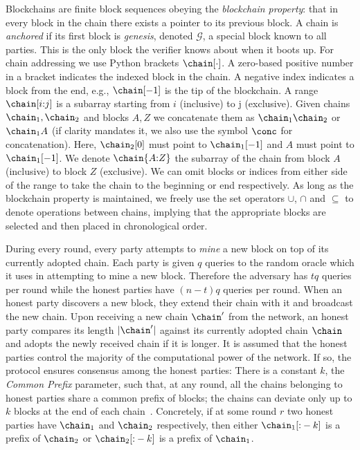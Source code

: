 Blockchains are finite block sequences obeying the \emph{blockchain property}:
that in every block in the chain there exists a pointer to its previous block. A
chain is \emph{anchored} if its first block is \emph{genesis}, denoted $\mathcal{G}$,
a special block known to all parties. This is the only block the verifier knows about
when it boots up. For chain addressing we use Python brackets $\chain[\cdot]$. A
zero-based positive number in a bracket indicates the indexed block in the
chain. A negative index indicates a block from the end, e.g., $\chain[-1]$ is
the tip of the blockchain. A range $\chain[i{:}j]$ is a subarray starting from
$i$ (inclusive) to j (exclusive). Given chains $\chain_1, \chain_2$ and blocks
$A, Z$ we concatenate them as $\chain_1 \chain_2$ or $\chain_1 A$ (if clarity
mandates it, we also use the symbol $\conc$ for concatenation). Here,
$\chain_2[0]$ must point to $\chain_1[-1]$ and $A$ must point to $\chain_1[-1]$.
We denote $\chain\{A{:}Z\}$ the subarray of the chain from block $A$ (inclusive) to
block $Z$ (exclusive). We can omit blocks or indices from either side of the range to
take the chain to the beginning or end respectively. As long as the blockchain
property is maintained, we freely use the set operators $\cup$, $\cap$ and
$\subseteq$ to denote operations between chains, implying that the appropriate
blocks are selected and then placed in chronological order.

During every round, every party attempts to \emph{mine} a new block on top of
its currently adopted chain. Each party is given $q$ queries to the random
oracle which it uses in attempting to mine a new block. Therefore the adversary
has $tq$ queries per round while the honest parties have $(n - t)q$ queries per
round. When an honest party discovers a new block, they extend their chain with
it and broadcast the new chain. Upon receiving a new chain $\chain'$ from the
network, an honest party compares its length $|\chain'|$ against its currently
adopted chain $\chain$ and adopts the newly received chain if it is longer. It
is assumed that the honest parties control the majority of the computational
power of the network. If so, the protocol
ensures consensus among the honest parties: There is a constant $k$, the
\emph{Common Prefix} parameter, such that, at any round, all the chains
belonging to honest parties share a common prefix of blocks; the chains can
deviate only up to $k$ blocks at the end of each chain~\cite{backbone}.
Concretely, if at some round $r$ two honest parties have $\chain_1$ and
$\chain_2$ respectively, then either $\chain_1[{:}-k]$ is a prefix of $\chain_2$
or $\chain_2[{:}-k]$ is a prefix of $\chain_1$.

